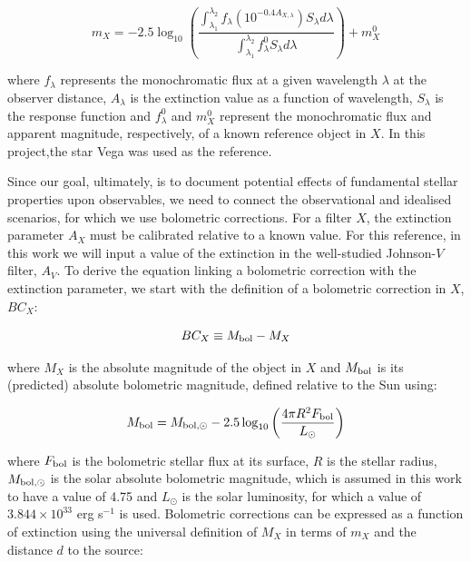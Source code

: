 \documentclass[12pt, a4paper]{report}
\begin{document}
\begin{equation}
m_{X} = -2.5 \log_{10} \left(\frac{ \int_{\lambda_{1}}^{\lambda_{2}} f_{\lambda} \left( 10^{-0.4 A_{X,\lambda}} \right) S_{\lambda} d\lambda }{ \int_{\lambda_{1}}^{\lambda_{2}} f_{\lambda}^{0} S_{\lambda} d\lambda }\right) + m_{X}^{0}
\label{app_mag_def}
\end{equation}

where $f_{\lambda}$ represents the monochromatic flux at a given wavelength $\lambda$ at the observer distance, $A_{\lambda}$ is the extinction value as a function of wavelength, $S_{\lambda}$ is the response function and $f_{\lambda}^{0}$ and $m_{X}^{0}$ represent the monochromatic flux and apparent magnitude, respectively, of a known reference object in $X$. In this project,the star Vega was used as the reference.

Since our goal, ultimately, is to document potential effects of fundamental stellar properties upon observables, we need to connect the observational and idealised scenarios, for which we use bolometric corrections. For a filter $X$, the extinction parameter $A_{X}$ must be calibrated relative to a known value. For this reference, in this work we will input a value of the extinction in the well-studied Johnson-$V$ filter, $A_{V}$.
To derive the equation linking a bolometric correction with the extinction parameter, we start with the definition of a bolometric correction in $X$, $BC_{X}$:

\begin{equation}
BC_{X} \equiv M_{\textnormal{bol}} - M_{X}
\label{BC_def}
\end{equation}

where $M_{X}$ is the absolute magnitude of the object in $X$ and $M_{\textnormal{bol}}$ is its (predicted) absolute bolometric magnitude, defined relative to the Sun using:

\begin{equation}
M_{\textnormal{bol}} = M_{\textnormal{bol},\odot} - 2.5 \log_{10} \left( \frac{4\pi R^{2}F_{\textnormal{bol}}}{L_{\odot}} \right)
\label{mbol_sun}
\end{equation}

where  $F_{\textnormal{bol}}$ is the bolometric stellar flux at its surface, $R$ is the stellar radius, $M_{\textnormal{bol},\odot}$ is the solar absolute bolometric magnitude, which is assumed in this work to have a value of 4.75 and $L_{\odot}$ is the solar luminosity, for which a value of $3.844 \times 10^{33}$ erg s$^{-1}$ is used. Bolometric corrections can be expressed as a function of extinction using the universal definition of $M_{X}$ in terms of $m_{X}$ and the distance $d$ to the source:
\end{document}
